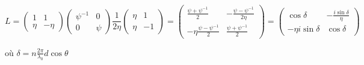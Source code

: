 \documentclass[a4paper,english]{article}
\begin{document}
\begin{dmath}
L = \begin{pmatrix} 1 & 1 \\ \eta & -\eta \end{pmatrix} \begin{pmatrix} \psi^{-1} & 0 \\ 0 & \psi \end{pmatrix} \frac{1}{2 \eta} \begin{pmatrix} \eta & 1 \\ \eta & -1 \end{pmatrix} = 
\begin{pmatrix} \frac{\psi + \psi^{-1}}{2} & -\frac{\psi - \psi^{-1}}{2\eta} \\ -\eta\frac{\psi - \psi^{-1}}{2} & \frac{\psi + \psi^{-1}}{2} \end{pmatrix} =
\begin{pmatrix} \cos \delta & -\frac{i \sin \delta}{\eta} \\ -\eta i \sin \delta & \cos \delta \end{pmatrix}
\end{dmath}

où $\delta = n \frac{2\pi}{\lambda_0} d \cos \theta$
\end{document}
